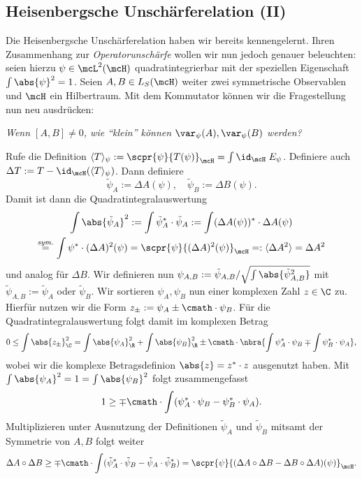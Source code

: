 \documentclass{subfiles}
\begin{document}
    \subsection{Heisenbergsche Unschärferelation (II)}
        Die Heisenbergsche Unschärferelation haben wir bereits kennengelernt. Ihren Zusammenhang zur \emph{Operatorunschärfe} wollen wir nun jedoch genauer beleuchten: seien hierzu $\psi\in\mcL^2(\mcH)$ quadratintegrierbar mit der speziellen Eigenschaft $\int\abs{\psi}^2 = 1$. Seien $A,B\in L_S(\mcH)$ weiter zwei symmetrische Observablen und $\mcH$ ein Hilbertraum. Mit dem Kommutator können wir die Fragestellung nun neu ausdrücken:
        \begin{center}
            \textit{Wenn $[A,B]\neq 0$, wie \enquote{klein} können $\var_\psi(A),\var_\psi(B)$ werden?}
        \end{center}
        Rufe die Definition $\langle T\rangle_\psi := \scpr{\psi}{T(\psi)}_\mcH = \int\id_\mcH\;E_\psi$. Definiere auch $\Delta T:= T-\id_{\mcH}(\langle T\rangle_\psi)$. Dann definiere 
        \[\tilde\psi_A:=\Delta A(\psi),\quad \tilde\psi_B:=\Delta B(\psi).\]
        Damit ist dann die Quadratintegralauswertung
        \begin{multline*}
            \int\abs{\tilde\psi_A}^2 := \int\tilde\psi_A^*\cdot\tilde\psi_A := \int (\Delta A(\psi))^*\cdot \Delta A(\psi) \\
            \stackrel{\textit{sym.}}{=} \int \psi^*\cdot (\Delta A)^2(\psi) = \scpr{\psi}{(\Delta A)^2(\psi)}_\mcH =: \langle\Delta A^2\rangle = \Delta A^2
        \end{multline*}
        und analog für $\Delta B$. Wir definieren nun $\psi_{A,B}:=\tilde\psi_{A,B}/\sqrt{\int\abs{\tilde\psi_{A,B}^2}}$ mit $\tilde\psi_{A,B}:= \tilde\psi_A$ oder $\tilde\psi_B$. Wir sortieren $\psi_A,\psi_B$ nun einer komplexen Zahl $z\in\C$ zu. Hierfür nutzen wir die Form $z_\pm:=\psi_A\pm\cmath\cdot\psi_B$. Für die Quadratintegralauswertung folgt damit im komplexen Betrag
        \[0\leq\int\abs{z_\pm}_\C^2 = \int\abs{\psi_A}_\R^2+\int\abs{\psi_B}_\R^2\pm\cmath\cdot\nbra{\int\psi_A^*\cdot\psi_B\mp\int\psi_B^*\cdot\psi_A},\]
        wobei wir die komplexe Betragsdefinion $\abs{z} = z^*\cdot z$ ausgenutzt haben. Mit $\int\abs{\psi_A}^2 = 1 = \int\abs{\psi_B}^2$ folgt zusammengefasst
        \[1\geq \mp\cmath\cdot\int (\psi_A^*\cdot\psi_B - \psi_B^*\cdot\psi_A).\]
        Multiplizieren unter Ausnutzung der Definitionen $\tilde\psi_A$ und $\tilde\psi_B$ mitsamt der Symmetrie von $A,B$ folgt weiter
        \[\Delta A\circ\Delta B\geq\mp\cmath\cdot\int(\tilde\psi_A^*\cdot\tilde\psi_B-\tilde\psi_A\cdot\tilde\psi_B^*) = \scpr{\psi}{(\Delta A\circ\Delta B-\Delta B\circ\Delta A)(\psi)}_\mcH.\]
\end{document}
